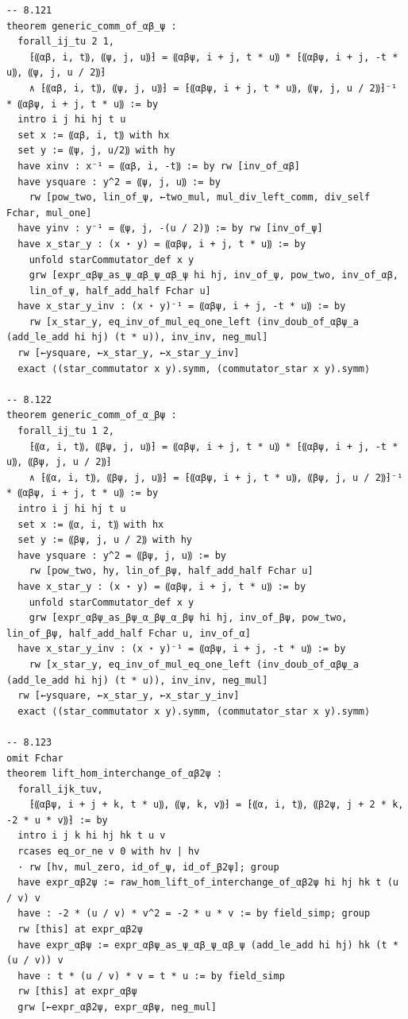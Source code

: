 \documentclass[10pt,a4paper]{article}
\begin{document}
\begin{Verbatim}
-- 8.121
theorem generic_comm_of_αβ_ψ :
  forall_ij_tu 2 1,
    ⁅⸨αβ, i, t⸩, ⸨ψ, j, u⸩⁆ = ⸨αβψ, i + j, t * u⸩ * ⁅⸨αβψ, i + j, -t * u⸩, ⸨ψ, j, u / 2⸩⁆
    ∧ ⁅⸨αβ, i, t⸩, ⸨ψ, j, u⸩⁆ = ⁅⸨αβψ, i + j, t * u⸩, ⸨ψ, j, u / 2⸩⁆⁻¹ * ⸨αβψ, i + j, t * u⸩ := by
  intro i j hi hj t u
  set x := ⸨αβ, i, t⸩ with hx
  set y := ⸨ψ, j, u/2⸩ with hy
  have xinv : x⁻¹ = ⸨αβ, i, -t⸩ := by rw [inv_of_αβ]
  have ysquare : y^2 = ⸨ψ, j, u⸩ := by
    rw [pow_two, lin_of_ψ, ←two_mul, mul_div_left_comm, div_self Fchar, mul_one]
  have yinv : y⁻¹ = ⸨ψ, j, -(u / 2)⸩ := by rw [inv_of_ψ]
  have x_star_y : (x ⋆ y) = ⸨αβψ, i + j, t * u⸩ := by
    unfold starCommutator_def x y
    grw [expr_αβψ_as_ψ_αβ_ψ_αβ_ψ hi hj, inv_of_ψ, pow_two, inv_of_αβ,
    lin_of_ψ, half_add_half Fchar u]
  have x_star_y_inv : (x ⋆ y)⁻¹ = ⸨αβψ, i + j, -t * u⸩ := by
    rw [x_star_y, eq_inv_of_mul_eq_one_left (inv_doub_of_αβψ_a (add_le_add hi hj) (t * u)), inv_inv, neg_mul]
  rw [←ysquare, ←x_star_y, ←x_star_y_inv]
  exact ⟨(star_commutator x y).symm, (commutator_star x y).symm⟩

-- 8.122
theorem generic_comm_of_α_βψ :
  forall_ij_tu 1 2,
    ⁅⸨α, i, t⸩, ⸨βψ, j, u⸩⁆ = ⸨αβψ, i + j, t * u⸩ * ⁅⸨αβψ, i + j, -t * u⸩, ⸨βψ, j, u / 2⸩⁆
    ∧ ⁅⸨α, i, t⸩, ⸨βψ, j, u⸩⁆ = ⁅⸨αβψ, i + j, t * u⸩, ⸨βψ, j, u / 2⸩⁆⁻¹ * ⸨αβψ, i + j, t * u⸩ := by
  intro i j hi hj t u
  set x := ⸨α, i, t⸩ with hx
  set y := ⸨βψ, j, u / 2⸩ with hy
  have ysquare : y^2 = ⸨βψ, j, u⸩ := by
    rw [pow_two, hy, lin_of_βψ, half_add_half Fchar u]
  have x_star_y : (x ⋆ y) = ⸨αβψ, i + j, t * u⸩ := by
    unfold starCommutator_def x y
    grw [expr_αβψ_as_βψ_α_βψ_α_βψ hi hj, inv_of_βψ, pow_two, lin_of_βψ, half_add_half Fchar u, inv_of_α]
  have x_star_y_inv : (x ⋆ y)⁻¹ = ⸨αβψ, i + j, -t * u⸩ := by
    rw [x_star_y, eq_inv_of_mul_eq_one_left (inv_doub_of_αβψ_a (add_le_add hi hj) (t * u)), inv_inv, neg_mul]
  rw [←ysquare, ←x_star_y, ←x_star_y_inv]
  exact ⟨(star_commutator x y).symm, (commutator_star x y).symm⟩

-- 8.123
omit Fchar
theorem lift_hom_interchange_of_αβ2ψ :
  forall_ijk_tuv,
    ⁅⸨αβψ, i + j + k, t * u⸩, ⸨ψ, k, v⸩⁆ = ⁅⸨α, i, t⸩, ⸨β2ψ, j + 2 * k, -2 * u * v⸩⁆ := by
  intro i j k hi hj hk t u v
  rcases eq_or_ne v 0 with hv | hv
  · rw [hv, mul_zero, id_of_ψ, id_of_β2ψ]; group
  have expr_αβ2ψ := raw_hom_lift_of_interchange_of_αβ2ψ hi hj hk t (u / v) v
  have : -2 * (u / v) * v^2 = -2 * u * v := by field_simp; group
  rw [this] at expr_αβ2ψ
  have expr_αβψ := expr_αβψ_as_ψ_αβ_ψ_αβ_ψ (add_le_add hi hj) hk (t * (u / v)) v
  have : t * (u / v) * v = t * u := by field_simp
  rw [this] at expr_αβψ
  grw [←expr_αβ2ψ, expr_αβψ, neg_mul]



\end{Verbatim}
\end{document}
